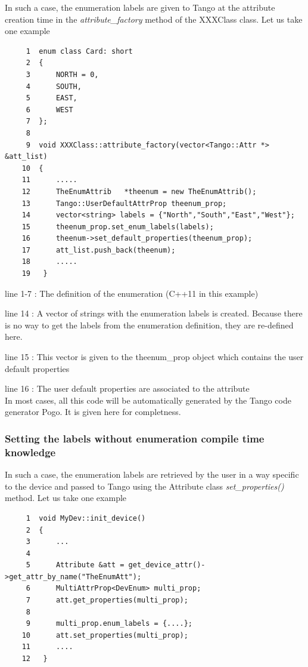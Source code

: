 In such a case, the enumeration labels are given to Tango at the attribute
creation time in the \emph{attribute\_factory} method of the XXXClass
class. Let us take one example


\begin{verbatim}
     1  enum class Card: short
     2  {
     3      NORTH = 0,
     4      SOUTH,
     5      EAST,
     6      WEST
     7  };
     8 
     9  void XXXClass::attribute_factory(vector<Tango::Attr *> &att_list)
    10  {
    11      .....
    12      TheEnumAttrib	*theenum = new TheEnumAttrib();
    13      Tango::UserDefaultAttrProp theenum_prop;
    14      vector<string> labels = {"North","South","East","West"};
    15      theenum_prop.set_enum_labels(labels);
    16      theenum->set_default_properties(theenum_prop);
    17      att_list.push_back(theenum);
    18      .....
    19   }	
\end{verbatim}


line 1-7 : The definition of the enumeration (C++11 in this example)

line 14 : A vector of strings with the enumeration labels is created.
Because there is no way to get the labels from the enumeration definition,
they are re-defined here.

line 15 : This vector is given to the theenum\_prop object which contains
the user default properties

line 16 : The user default properties are associated to the attribute\\


In most cases, all this code will be automatically generated by the
Tango code generator Pogo. It is given here for completness.


\subsubsection{Setting the labels without enumeration compile time knowledge}

In such a case, the enumeration labels are retrieved by the user in
a way specific to the device and passed to Tango using the Attribute
class \emph{set\_properties()} method. Let us take one example


\begin{verbatim}
     1  void MyDev::init_device()
     2  {
     3      ...
     4  
     5      Attribute &att = get_device_attr()->get_attr_by_name("TheEnumAtt");
     6      MultiAttrProp<DevEnum> multi_prop;
     7      att.get_properties(multi_prop);
     8 
     9      multi_prop.enum_labels = {....};
    10      att.set_properties(multi_prop);
    11      ....
    12   }	
\end{verbatim}


